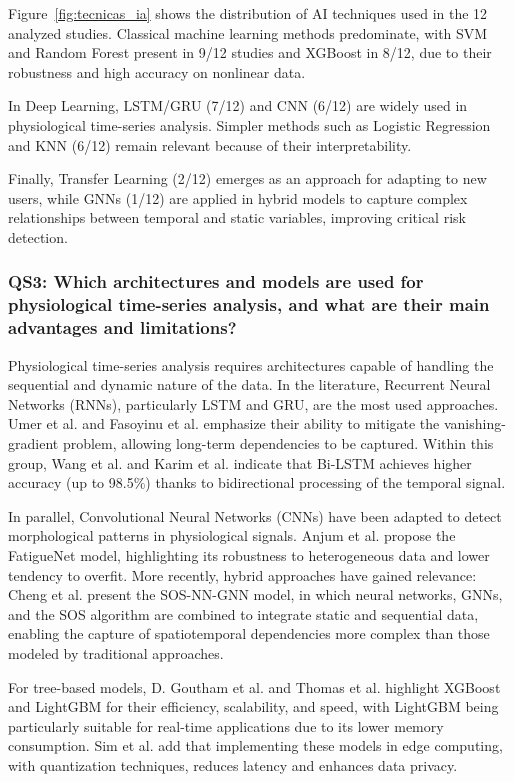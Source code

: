 \documentclass[runningheads]{llncs}
\begin{document}
Figure~\ref{fig:tecnicas_ia} shows the distribution of AI techniques used in the 12 analyzed studies. Classical machine learning methods predominate, with SVM and Random Forest present in 9/12 studies and XGBoost in 8/12, due to their robustness and high accuracy on nonlinear data.

In Deep Learning, LSTM/GRU (7/12) and CNN (6/12) are widely used in physiological time-series analysis. Simpler methods such as Logistic Regression and KNN (6/12) remain relevant because of their interpretability.

Finally, Transfer Learning (2/12) emerges as an approach for adapting to new users, while GNNs (1/12) are applied in hybrid models to capture complex relationships between temporal and static variables, improving critical risk detection.

\subsubsection*{QS3: Which architectures and models are used for physiological time-series analysis, and what are their main advantages and limitations?}
\label{subsec:qs3}

Physiological time-series analysis requires architectures capable of handling the sequential and dynamic nature of the data. In the literature, Recurrent Neural Networks (RNNs), particularly LSTM and GRU, are the most used approaches. Umer et al. and Fasoyinu et al.\cite{umer2025,fasoyinu2025} emphasize their ability to mitigate the vanishing-gradient problem, allowing long-term dependencies to be captured. Within this group, Wang et al. and Karim et al.\cite{wang2024,karim2025} indicate that Bi-LSTM achieves higher accuracy (up to 98.5\%) thanks to bidirectional processing of the temporal signal.

In parallel, Convolutional Neural Networks (CNNs) have been adapted to detect morphological patterns in physiological signals. Anjum et al. propose the FatigueNet model, highlighting its robustness to heterogeneous data and lower tendency to overfit\cite{anjum2025}. More recently, hybrid approaches have gained relevance: Cheng et al.\cite{cheng2025} present the SOS-NN-GNN model, in which neural networks, GNNs, and the SOS algorithm are combined to integrate static and sequential data, enabling the capture of spatiotemporal dependencies more complex than those modeled by traditional approaches.

For tree-based models, D. Goutham et al. and Thomas et al.\cite{goutham2025,thomas2025} highlight XGBoost and LightGBM for their efficiency, scalability, and speed, with LightGBM being particularly suitable for real-time applications due to its lower memory consumption. Sim et al.\cite{sim2023} add that implementing these models in edge computing, with quantization techniques, reduces latency and enhances data privacy.
\end{document}

